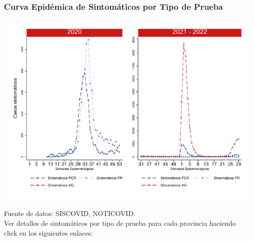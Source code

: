 \documentclass[xcolor=table]{beamer}
\begin{document}
	\begin{frame}[label=TipoPrueba]
		\frametitle{Curva Epidémica de Sintomáticos por Tipo de Prueba}
		\vspace{-.15cm}
		\begin{center}
			\includegraphics[width=0.7\linewidth, trim={0cm 0cm 0cm 0cm},clip]{../figuras/sinto_prueba_20_21_22.pdf}
		\end{center}
	\vspace{-.5cm}
		{\tiny Fuente de datos: SISCOVID, NOTICOVID.}\\
		Ver detalles de sintomáticos por tipo de prueba para cada provincia haciendo click en los siguientes enlaces:
		\hyperlink{Acomayo}{} 
		\hyperlink{Anta}{} 
		\hyperlink{Calca}{} 
		\hyperlink{Canas}{} \hyperlink{Chumbivilcas}{}
		\hyperlink{Canchis}{} 
		\hyperlink{Cusco}{}
		\hyperlink{Espinar}{}
		\hyperlink{laconvecion}{}
		\hyperlink{Paruro}{} \hyperlink{Paucartambo}{}
		\hyperlink{Quispicanchi}{}
		\hyperlink{Urubamba}{}
		\end{frame}
	
\end{document}

